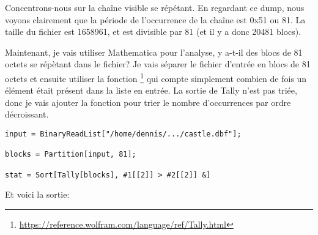 

Concentrons-nous sur la chaîne visible  se répétant.
En regardant ce dump, nous voyons clairement que la période de l'occurrence de la chaîne
est 0x51 ou 81.
La taille du fichier est 1658961, et est divisible par 81 (et il y a donc 20481 blocs).

Maintenant, je vais utiliser Mathematica pour l'analyse, y a-t-il des blocs de 81
octets se répètant dans le fichier?
Je vais séparer le fichier d'entrée en blocs de 81 octets et ensuite utiliser la fonction
\footnote{\url{https://reference.wolfram.com/language/ref/Tally.html}}
qui compte simplement combien de fois un élément était présent dans la liste en entrée.
La sortie de Tally n'est pas triée, donc je vais ajouter la fonction 
pour trier le nombre d'occurrences par ordre décroissant.

\begin{lstlisting}[style=custommath]
input = BinaryReadList["/home/dennis/.../castle.dbf"];

blocks = Partition[input, 81];

stat = Sort[Tally[blocks], #1[[2]] > #2[[2]] &]
\end{lstlisting}

Et voici la sortie:

